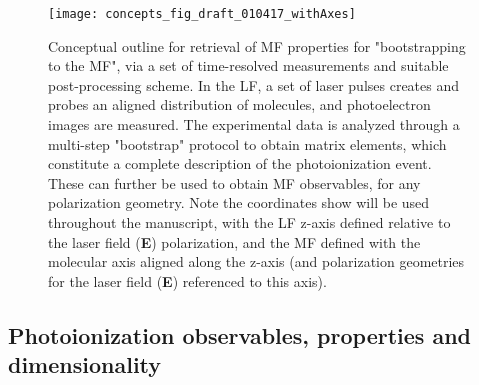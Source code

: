 \documentclass[10pt]{article}
\begin{document}

\begin{figure}[]
\begin{center}
\texttt{[image: concepts\_fig\_draft\_010417\_withAxes]}
\caption{Conceptual outline for retrieval of MF properties for "bootstrapping to the MF", via a set of time-resolved measurements and suitable post-processing scheme. In the LF, a set of laser pulses creates and probes an aligned distribution of molecules, and photoelectron images are measured. The experimental data is analyzed through a multi-step "bootstrap" protocol to obtain matrix elements, which constitute a complete description of the photoionization event. These can further be used to obtain MF observables, for any polarization geometry. Note the coordinates show will be used throughout the manuscript, with the LF z-axis defined relative to the laser field (\textbf{E}) polarization, and the MF defined with the molecular axis aligned along the z-axis (and polarization geometries for the laser field (\textbf{E}) referenced to this axis).\label{781808}}
\end{center}
\end{figure}



\subsection{Photoionization observables, properties and dimensionality\label{sec:Photo-into}}
\end{document}

